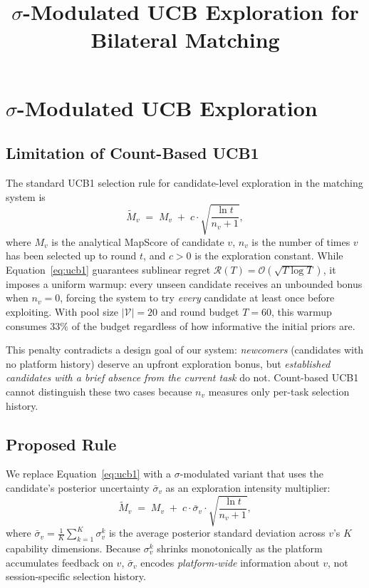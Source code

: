 \documentclass[11pt]{article}
\title{$\sigma$-Modulated UCB Exploration for Bilateral Matching}
\author{}
\date{}
\begin{document}
\maketitle

\section{$\sigma$-Modulated UCB Exploration}
\label{sec:sigma-ucb}

\subsection{Limitation of Count-Based UCB1}

The standard UCB1 selection rule for candidate-level exploration in the matching
system is
\begin{equation}
\widetilde{M}_v \;=\; M_v \;+\; c \cdot \sqrt{\frac{\ln t}{n_v + 1}},
\label{eq:ucb1}
\end{equation}
where $M_v$ is the analytical MapScore of candidate $v$, $n_v$ is the number of
times $v$ has been selected up to round $t$, and $c > 0$ is the exploration
constant. While Equation~\eqref{eq:ucb1} guarantees sublinear regret
$\mathcal{R}(T) = \mathcal{O}(\sqrt{T \log T})$, it imposes a uniform warmup:
every unseen candidate receives an unbounded bonus when $n_v = 0$, forcing the
system to try \emph{every} candidate at least once before exploiting. With pool
size $|\mathcal{V}| = 20$ and round budget $T = 60$, this warmup consumes $33\%$
of the budget regardless of how informative the initial priors are.

This penalty contradicts a design goal of our system: \emph{newcomers}
(candidates with no platform history) deserve an upfront exploration bonus, but
\emph{established candidates with a brief absence from the current task} do not.
Count-based UCB1 cannot distinguish these two cases because $n_v$ measures
only per-task selection history.

\subsection{Proposed Rule}

We replace Equation~\eqref{eq:ucb1} with a $\sigma$-modulated variant that uses
the candidate's posterior uncertainty $\bar{\sigma}_v$ as an exploration
intensity multiplier:
\begin{equation}
\widetilde{M}_v \;=\; M_v \;+\; c \cdot \bar{\sigma}_v \cdot
\sqrt{\frac{\ln t}{n_v + 1}},
\label{eq:sigma-ucb}
\end{equation}
where
$\bar{\sigma}_v = \frac{1}{K}\sum_{k=1}^{K} \sigma_v^k$
is the average posterior standard deviation across $v$'s $K$ capability
dimensions. Because $\sigma_v^k$ shrinks monotonically as the platform
accumulates feedback on $v$, $\bar{\sigma}_v$ encodes \emph{platform-wide}
information about $v$, not session-specific selection history.
\end{document}
